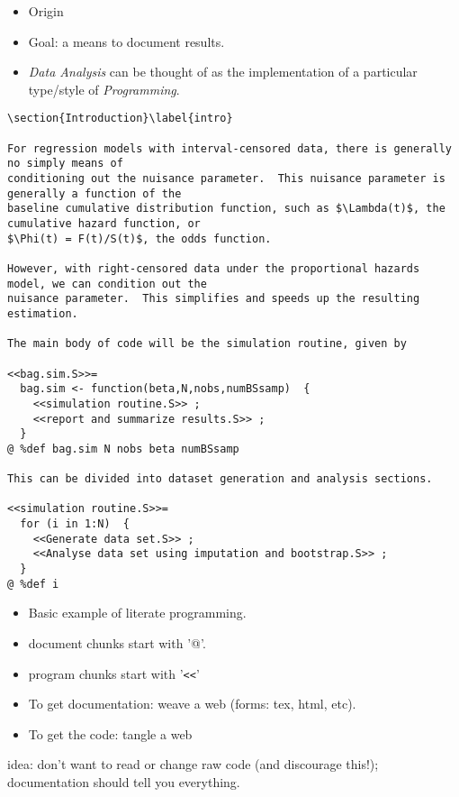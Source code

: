 \documentclass[semhelv]{seminar}
\begin{document}
\begin{itemize}
\item Origin
\item Goal: a means to document results.
\item \emph{Data Analysis} can be thought of as the implementation of
  a particular type/style of \emph{Programming}.
\end{itemize}

\begin{slide}
{\tiny
\begin{verbatim}
\section{Introduction}\label{intro}

For regression models with interval-censored data, there is generally no simply means of
conditioning out the nuisance parameter.  This nuisance parameter is generally a function of the
baseline cumulative distribution function, such as $\Lambda(t)$, the cumulative hazard function, or
$\Phi(t) = F(t)/S(t)$, the odds function. 

However, with right-censored data under the proportional hazards model, we can condition out the
nuisance parameter.  This simplifies and speeds up the resulting estimation. 

The main body of code will be the simulation routine, given by 

<<bag.sim.S>>=
  bag.sim <- function(beta,N,nobs,numBSsamp)  {
    <<simulation routine.S>> ;
    <<report and summarize results.S>> ;
  }
@ %def bag.sim N nobs beta numBSsamp

This can be divided into dataset generation and analysis sections.

<<simulation routine.S>>=
  for (i in 1:N)  {
    <<Generate data set.S>> ;
    <<Analyse data set using imputation and bootstrap.S>> ;
  }
@ %def i
\end{verbatim}
}
\end{slide}

\begin{itemize}
\item Basic example of literate programming.
\item document chunks start with '@'.
\item program chunks start with '\verb$<<$'
\end{itemize}

\begin{slide}

  \begin{itemize}
  \item To get documentation: weave a web  (forms: tex, html, etc).
  \item To get the code: tangle a web
  \end{itemize}
  idea: don't want to read or change raw code (and discourage this!);
  documentation should tell you everything.
\end{slide}
\end{document}
